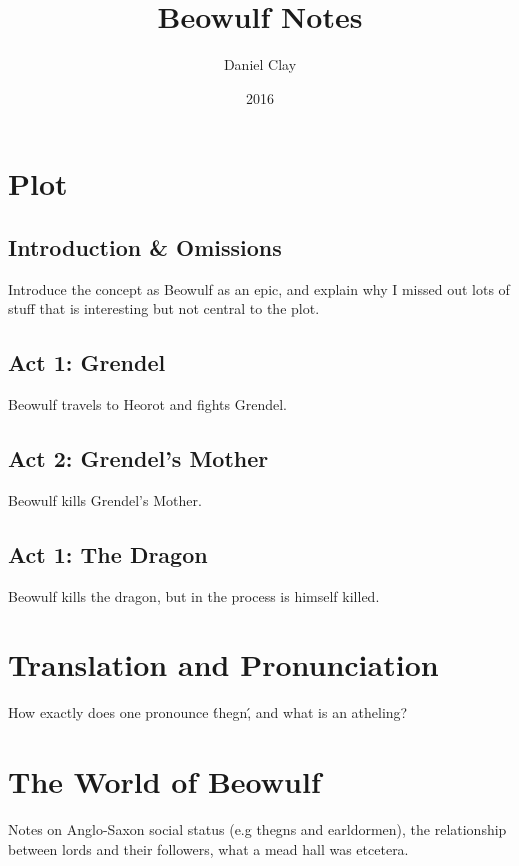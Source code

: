 \documentclass[a4paper]{article}
\begin{document}
\title{Beowulf Notes}
\date{2016}
\author{
Daniel Clay \\ 
}
\maketitle

\section{Plot}

\subsection{Introduction \& Omissions}%

Introduce the concept as Beowulf as an epic, and explain why I missed out lots of
stuff that is interesting but not central to the plot. 

\subsection{Act 1: Grendel}%

Beowulf travels to Heorot and fights Grendel.

\subsection{Act 2: Grendel's Mother}%

Beowulf kills Grendel's Mother.

\subsection{Act 1: The Dragon}%

Beowulf kills the dragon, but in the process is himself killed.

\section{Translation and Pronunciation}

How exactly does one pronounce \'thegn\', and what is an atheling? 

\section{The World of Beowulf}

Notes on Anglo-Saxon social status (e.g thegns and earldormen), the relationship
between lords and their followers, what a mead hall was etcetera.
\end{document}
